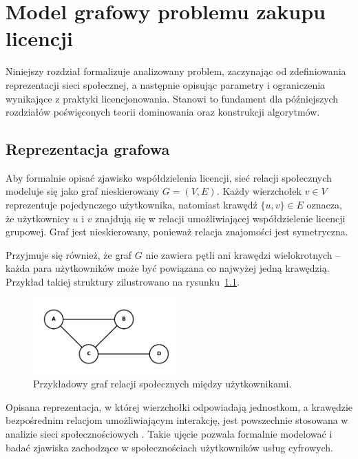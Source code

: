 \chapter{Model grafowy problemu zakupu licencji}

Niniejszy rozdział formalizuje analizowany problem, zaczynając od zdeﬁniowania reprezentacji sieci społecznej, a następnie opisując parametry i ograniczenia wynikające z praktyki licencjonowania. Stanowi to fundament dla późniejszych rozdziałów poświęconych teorii dominowania oraz konstrukcji algorytmów.

\section{Reprezentacja grafowa}

Aby formalnie opisać zjawisko współdzielenia licencji, sieć relacji społecznych modeluje się jako graf nieskierowany \( G = (V, E) \). Każdy wierzchołek \( v \in V \) reprezentuje pojedynczego użytkownika, natomiast krawędź \( \{u, v\} \in E \) oznacza, że użytkownicy \( u \) i \( v \) znajdują się w relacji umożliwiającej współdzielenie licencji grupowej. Graf jest nieskierowany, ponieważ relacja znajomości jest symetryczna.

Przyjmuje się również, że graf \( G \) nie zawiera pętli ani krawędzi wielokrotnych -- każda para użytkowników może być powiązana co najwyżej jedną krawędzią. Przykład takiej struktury zilustrowano na rysunku~\ref{fig:social_graph}.

\begin{figure}[H]
  \centering
  \includegraphics[width=0.5\textwidth]{assets/graphmodelexample.png}
  \caption{Przykładowy graf relacji społecznych między użytkownikami.}
  \label{fig:social_graph}
\end{figure}

Opisana reprezentacja, w której wierzchołki odpowiadają jednostkom, a krawędzie bezpośrednim relacjom umożliwiającym interakcję, jest powszechnie stosowana w analizie sieci społecznościowych \cite{Brandes2005, NETTLETON20131}. Takie ujęcie pozwala formalnie modelować i badać zjawiska zachodzące w społecznościach użytkowników usług cyfrowych.

